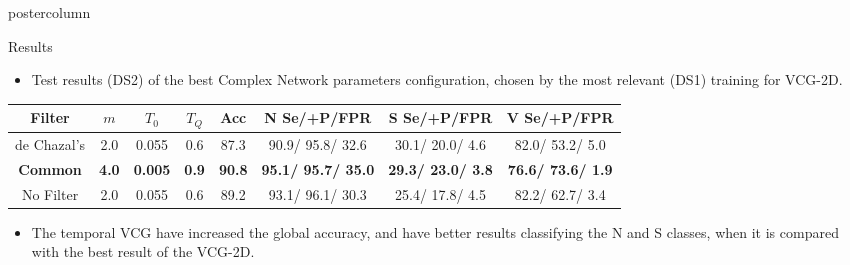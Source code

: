 \documentclass[final,hyperref={pdfpagelabels=false}]{beamer}
\begin{document}
\begin{frame}
\begin{columns}
\begin{column}{.5\textwidth}
\begin{beamercolorbox}[center,wd=\textwidth]{postercolumn}
\begin{minipage}[T]{.98\textwidth}
{\begin{block}{Results}
{\begin{table}[h!]
\begin{center}
            				\end{center}
            			\end{table}}
            			\begin{itemize}
            				\item Test results (DS2) of the best Complex Network parameters configuration, chosen by the most relevant (DS1) training for VCG-2D.
            			\end{itemize}
            			{\small				
            				\begin{table}[h!]					
            					\begin{center}						
            						\label{tab:results2d} 
            						\centering	
            						\begin{tabular}{|c|c|c|c|c|c|c|c|} 
            							\hline 
            							Filter & $m$ & $T_0$ & $T_Q$ & Acc & N Se/+P/FPR & S Se/+P/FPR & V Se/+P/FPR  \\ \hline \hline
            							de Chazal's & 2.0 & 0.055 & 0.6 &   87.3 &   90.9/  95.8/  32.6 &   30.1/  20.0/   4.6 &   82.0/  53.2/   5.0 \\ 			\hline
            							\textbf{Common}   & \textbf{4.0} & \textbf{0.005} & \textbf{0.9} &   \textbf{90.8} &   \textbf{95.1/  95.7/  35.0} &   \textbf{29.3/  23.0/   3.8} &   \textbf{76.6/  73.6/   1.9} \\			\hline
            							No Filter& 2.0 & 0.055 & 0.6 &    89.2 &   93.1/  96.1/  30.3 &   25.4/  17.8/   4.5 &   82.2/  62.7/   3.4 \\ 		\hline \hline
            						\end{tabular} 
            						\vspace{0.15cm}
            						\linebreak 						
            					\end{center}
            				\end{table}}
            \begin{itemize}
            	\item The temporal VCG have increased the global accuracy, and have better results classifying the N and S classes, when it is compared with the best result of the VCG-2D.
            	
            \end{itemize}
            

\end{block}}
\end{minipage}
\end{beamercolorbox}
\end{column}
\end{columns}
\end{frame}
\end{document}
